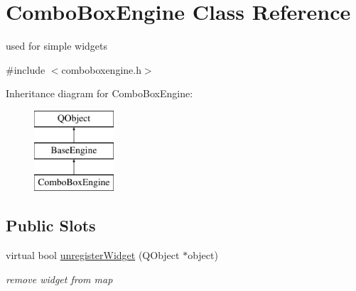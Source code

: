 \hypertarget{class_combo_box_engine}{}\section{Combo\+Box\+Engine Class Reference}
\label{class_combo_box_engine}


used for simple widgets  




{\ttfamily \#include $<$comboboxengine.\+h$>$}

Inheritance diagram for Combo\+Box\+Engine\+:\begin{figure}[H]
\begin{center}
\leavevmode
\includegraphics[height=3.000000cm]{class_combo_box_engine}
\end{center}
\end{figure}
\subsection*{Public Slots}
\begin{DoxyCompactItemize}
\item 
\mbox{\label{class_combo_box_engine_af35e98b62d1488a611135e785970b7aa}} 
virtual bool \hyperlink{class_combo_box_engine_af35e98b62d1488a611135e785970b7aa}{unregister\+Widget} (Q\+Object $\ast$object)
\begin{DoxyCompactList}\small\item\em remove widget from map \end{DoxyCompactList}\end{DoxyCompactItemize}
